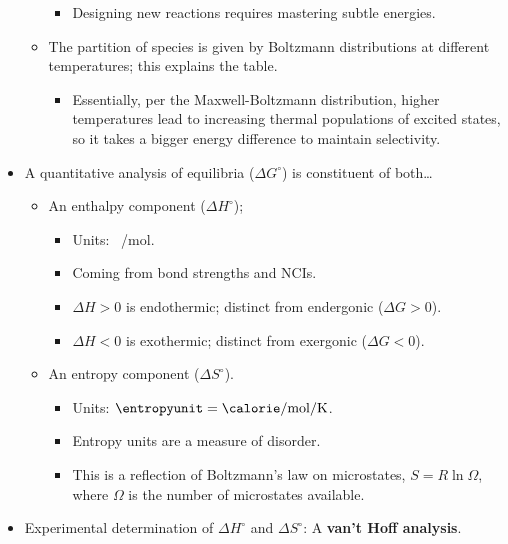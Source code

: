 \documentclass[../notes.tex]{subfiles}
\begin{document}
\begin{itemize}
\begin{itemize}
        \begin{itemize}
            \item Designing new reactions requires mastering subtle energies.
        \end{itemize}
        \item The partition of species is given by Boltzmann distributions at different temperatures; this explains the table.
        \begin{itemize}
            \item Essentially, per the Maxwell-Boltzmann distribution, higher temperatures lead to increasing thermal populations of excited states, so it takes a bigger energy difference to maintain selectivity.
        \end{itemize}
    \end{itemize}
    \item A quantitative analysis of equilibria ($\Delta G^\circ$) is constituent of both\dots
    \begin{itemize}
        \item An enthalpy component ($\Delta H^\circ$);
        \begin{itemize}
            \item Units: \si[per-mode=symbol]{\kilo\calorie\per\mole}.
            \item Coming from bond strengths and NCIs.
            \item $\Delta H>0$ is endothermic; distinct from endergonic ($\Delta G>0$).
            \item $\Delta H<0$ is exothermic; distinct from exergonic ($\Delta G<0$).
        \end{itemize}
        \item An entropy component ($\Delta S^\circ$).
        \begin{itemize}
            \item Units: $\si{\entropyunit}=\si[per-mode=symbol]{\calorie\per\mole\per\kelvin}$.
            \item Entropy units are a measure of disorder.
            \item This is a reflection of Boltzmann's law on microstates, $S=R\ln\Omega$, where $\Omega$ is the number of microstates available.
        \end{itemize}
    \end{itemize}
    \pagebreak
    \item Experimental determination of $\Delta H^\circ$ and $\Delta S^\circ$: A \textbf{van't Hoff analysis}.
    \begin{itemize}

\end{itemize}
\end{itemize}
\end{document}
